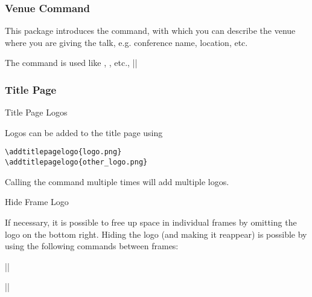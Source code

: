 \documentclass[9pt]{beamer}
\begin{document}
\showlogo

\begin{frame}
  \frametitle{Venue Command}

  This package introduces the  command, with which you can
  describe the venue where you are giving the talk, e.g. conference name,
  location, etc.\newline

  The command is used like , , etc.,
  ||

\end{frame}

\begin{frame}[fragile]
  \frametitle{Title Page}

  \begin{block}{Title Page Logos}

    Logos can be added to the title page using
    \begin{verbatim}
\addtitlepagelogo{logo.png}
\addtitlepagelogo{other_logo.png}
    \end{verbatim}

    Calling the command multiple times will add multiple logos.
  \end{block}

  \begin{block}{Hide Frame Logo}

    If necessary, it is possible to free up space in individual frames by
    omitting the logo on the bottom right.  Hiding the logo (and making it
    reappear) is possible by using the following commands between frames:

    |\hidelogo|

    |\showlogo|
  \end{block}

\end{frame}

\hidelogo
\end{document}
